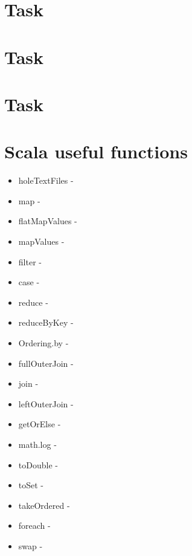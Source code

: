 \documentclass[paper=a4, fontsize=11pt]{scrartcl}
\numberwithin{equation}{section}		%
\numberwithin{figure}{section}			%
\numberwithin{table}{section}				%
\begin{document}
\section{Task}

\section{Task}
\section{Task}


\section{Scala useful functions}
\begin{itemize}
	\item holeTextFiles - 
	\item map - 
	\item flatMapValues -  
	\item mapValues -  
	\item filter -  
	\item case - 
	\item reduce - 
	\item reduceByKey - 
	\item Ordering.by -
	\item fullOuterJoin - 
	\item join - 
	\item leftOuterJoin - 
	\item getOrElse -  
	\item math.log -
	\item toDouble -
	\item toSet -
	\item takeOrdered -
	\item foreach -
	\item swap -
\end{itemize}
\end{document}
